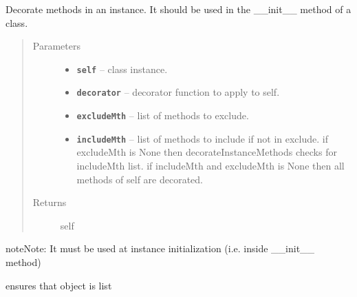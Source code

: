 \documentclass[letterpaper,10pt,english]{sphinxmanual}
\begin{document}

\begin{fulllineitems}
\label{RRtoolbox.lib:RRtoolbox.lib.root.decorateInstanceMethods}
Decorate methods in an instance. It should be used in the \_\_init\_\_ method of a class.
\begin{quote}\begin{description}
\item[{Parameters}] \leavevmode\begin{itemize}
\item {} 
\textbf{\texttt{self}} -- class instance.

\item {} 
\textbf{\texttt{decorator}} -- decorator function to apply to self.

\item {} 
\textbf{\texttt{excludeMth}} -- list of methods to exclude.

\item {} 
\textbf{\texttt{includeMth}} -- list of methods to include if not in exclude.
if excludeMth is None then decorateInstanceMethods checks for includeMth list.
if includeMth and excludeMth is None then all methods of self are decorated.

\end{itemize}

\item[{Returns}] \leavevmode
self

\end{description}\end{quote}

\begin{notice}{note}{Note:}
It must be used at instance initialization (i.e. inside \_\_init\_\_ method)
\end{notice}

\end{fulllineitems}


\begin{fulllineitems}
\label{RRtoolbox.lib:RRtoolbox.lib.root.ensureList}
ensures that object is list

\end{fulllineitems}
\end{document}
